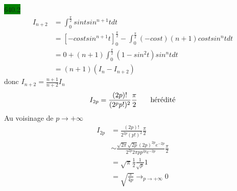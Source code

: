 \documentclass{article}
\begin{document}
\noindent \colorbox{green}{640.2}
\begin{align*}
    I_{n+2} &= \int_{0}^{\frac{\pi}{2}} sint sin^{n+1}t dt \\
    &= [-cost sin^{n+1}t]^{\frac{\pi}{2}}_0 - \int_{0}^{\frac{\pi}{2}}(-cost)(n+1)cost sin^nt dt \\
    &= 0 + (n+1)\int_{0}^{\frac{\pi}{2}} (1-sin^2t)sin^nt dt \\
    &= (n+1)(I_n - I_{n+2})
\end{align*}
donc \(I_{n+2} = \frac{n+1}{n+2}I_n\)
\begin{align*}
    I_{2p} = \frac{(2p)!}{(2^p p!)^2}\frac{\pi}{2} \indent \text{ hérédité}
\end{align*}
Au voisinage de \(p \to +\infty\)\\
\begin{align*}
    I_{2p} &= \frac{(2p)!}{2^{2p}(p!)^2}\frac{\pi}{2}\\
    &\sim \frac{\sqrt{2\pi}\sqrt{2p}(2p)^{2p}e^{-2p}}{2^{2p}2\pi p p^{2p}e^{-2p}}\frac{\pi}{2}\\
    &= \sqrt{\pi}\frac{1}{2}\frac{1}{\sqrt{p}} 1\\
    &= \sqrt{\frac{\pi}{4p}}
    \rightarrow_{p \to +\infty}0
\end{align*}
\end{document}
